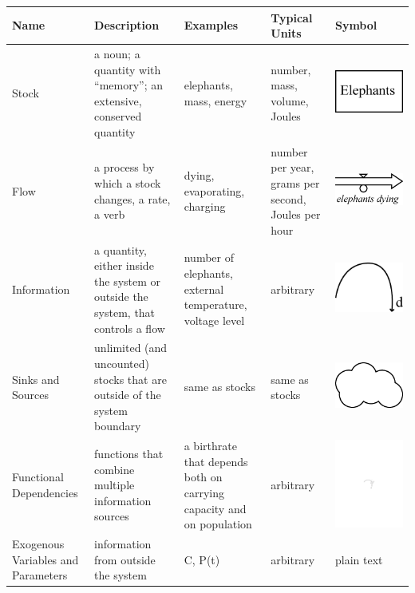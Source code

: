 \begin{center}
\begin{tabular}{ | p{2cm} | p{3cm} | p{3cm} | p{2cm}  | p{3cm}  |}
Name & Description & Examples & Typical Units & Symbol \\
\hline
Stock & a noun; a quantity with ``memory''; an extensive, conserved quantity & elephants, mass, energy & number, mass, volume, Joules & \vspace{0.1in} \includegraphics[height=.5in]{figs/stock} \\

\hline
Flow & a process by which a stock changes, a rate, a verb & dying, evaporating, charging & number per year, grams per second, Joules per hour & \vspace{0.1in} \includegraphics[height=.4in]{figs/flow}\\

\hline
Information & a quantity, either inside the system or outside the system, that controls a flow & number of elephants, external temperature, voltage level & arbitrary &  \vspace{0.1in}\includegraphics[height=.5in]{figs/information}\\

\hline
Sinks and Sources & unlimited (and uncounted) stocks that are outside of the system boundary & same as stocks & same as stocks &  \vspace{0.1in}\includegraphics[height=.5in]{figs/sink} \\

\hline
Functional Dependencies & functions that combine multiple information sources & a birthrate that depends both on carrying capacity and on population & arbitrary &  \vspace{0.1in}\includegraphics[height=.5in]{figs/FunctionalDependence} \\

\hline
Exogenous Variables and Parameters& information from outside the system & C, P(t) & arbitrary &  plain text \\

\end{tabular}
\end{center}

